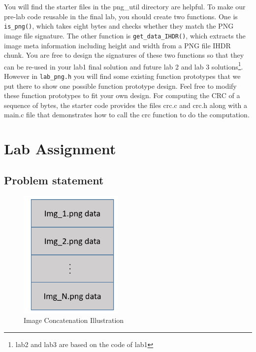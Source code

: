 You will find the starter files in the png\_util directory are helpful. To make our pre-lab code reusable in the final lab, you should create two functions. One is \verb+is_png()+, which takes eight bytes and checks whether they match the PNG image file signature. The other function is \verb+get_data_IHDR()+, which extracts the image meta information including height and width from a PNG file IHDR chunk. You are free to design the signatures of these two functions so that they can be re-used in your lab1 final solution and future lab 2 and lab 3 solutions\footnote{lab2 and lab3 are based on the code of lab1}. However in \verb+lab_png.h+ you will find some existing function prototypes that we put there to show one possible function prototype design. Feel free to modify these function prototypes to fit your own design. For computing the CRC of a sequence of bytes, the starter code provides the files crc.c and crc.h along with a main.c file that demonstrates how to call the crc function to do the computation.
\section{Lab Assignment}
\subsection{Problem statement}

\begin{figure}
  \includegraphics[width=2in]{img/img_concatenation}
  \caption{Image Concatenation Illustration}
\label{fig_img_concatenation}
\end{figure}

